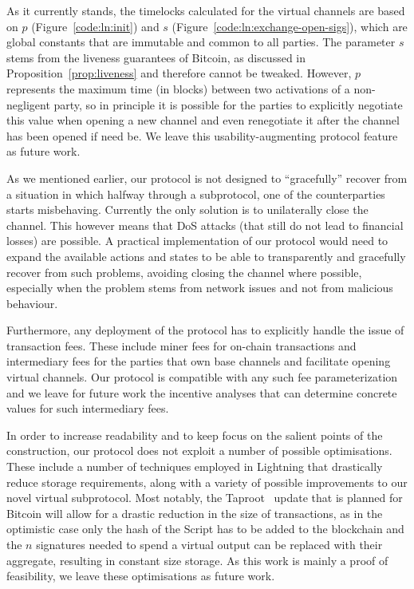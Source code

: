   As it currently stands, the timelocks calculated for the virtual channels are
  based on $p$ (Figure~\ref{code:ln:init}) and $s$
  (Figure~\ref{code:ln:exchange-open-sigs}),
  which are global constants that are immutable and common to all parties. The 
  parameter $s$
  stems from the liveness guarantees of Bitcoin, as discussed in
  Proposition~\ref{prop:liveness} and therefore cannot be tweaked. However, $p$
  represents the maximum time (in blocks) between two activations of a non-negligent party,
  so in principle it is possible for the parties to explicitly negotiate this
  value when opening a new channel and even renegotiate it after the channel has
  been opened if need be. We leave this usability-augmenting protocol feature as
  future work.

  As we mentioned earlier, our protocol is not designed to ``gracefully'' recover
  from a situation in which halfway through a subprotocol, one of the
  counterparties starts misbehaving. Currently the only solution is to
  unilaterally close the channel. This however means that DoS attacks (that
  still do not lead to financial losses) are possible. A practical
  implementation of our protocol would need to expand the available actions and
  states to be able to transparently and gracefully recover from such problems,
  avoiding closing the channel where possible, especially when the problem stems
  from network issues and not from malicious behaviour.

  Furthermore, any deployment of the protocol
  has to explicitly handle the issue of
   transaction fees. These include miner fees for on-chain transactions and intermediary fees
  for the parties that own base channels and facilitate opening virtual
  channels. Our protocol is compatible with any such fee parameterization and 
  we leave for future work the incentive analyses that can determine concrete
  values for such intermediary fees. 

  In order to increase readability and to keep focus on the salient points of
  the construction, our protocol does not exploit a number of possible
  optimisations. These include a number of techniques employed in Lightning that
  drastically reduce storage requirements, along with a variety of possible
  improvements to our novel virtual subprotocol. Most notably, the
  Taproot~\cite{taproot} update that is planned for Bitcoin will allow for a
  drastic reduction in the size of transactions, as in the optimistic case only
  the hash of the Script has to be added to the blockchain and the $n$
  signatures needed to spend a virtual output can be replaced with their
  aggregate, resulting in constant size storage. As this work is mainly a proof of
  feasibility, we leave these optimisations as future work.

